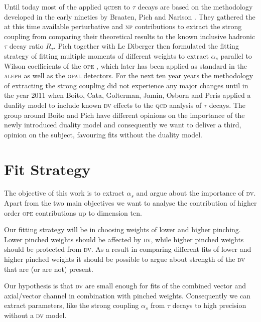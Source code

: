 \documentclass[../../index.tex]{subfiles}
\begin{document}
Until today most of the applied \textsc{qcdsr} to \(\tau\) decays are based on
the methodology developed in the early nineties by Braaten, Pich and Narison
\cite{Braaten1991}. They gathered the at this time available perturbative and
\textsc{np} contributions to extract the strong coupling from comparing their
theoretical results to the known inclusive hadronic \(\tau\) decay ratio
\(R_\tau\). Pich together with Le Diberger then formulated the fitting strategy
of fitting multiple moments of different weights to extract \(\alpha_s\)
parallel to Wilson coefficients of the \textsc{ope} \cite{LeDiberger1992}, which
later has been applied as standard in the \textsc{aleph} \cite{Aleph1993} as
well as the \textsc{opal} \cite{Opal1998} detectors. For the next ten year years
the methodology of extracting the strong coupling did not experience any major
changes until in the year 2011 when Boito, Cata, Golterman, Jamin, Osborn and
Peris \cite{Boito2011a} applied a duality model to include known \textsc{dv}
effects to the \textsc{qcd} analysis of \(\tau\) decays. The group around Boito
and Pich have different opinions on the importance of the newly introduced
duality model \cite{Pich2016,Boito2016,} and consequently we want to deliver a
third, opinion on the subject, favouring fits without the duality model.


\section{Fit Strategy}
The objective of this work is to extract \(\alpha_s\) and argue about the
importance of \textsc{dv}. Apart from the two main objectives we want to analyse
the contribution of higher order \textsc{ope} contributions up to dimension ten.

Our fitting strategy will be in choosing weights of lower and higher pinching.
Lower pinched weights should be affected by \textsc{dv}, while higher pinched
weights should be protected from \textsc{dv}. As a result in comparing different
fits of lower and higher pinched weights it should be possible to argue about
strength of the \textsc{dv} that are (or are not) present.

Our hypothesis is that \textsc{dv} are small enough for fits of the combined
vector and axial\-/vector channel in combination with pinched weights.
Consequently we can extract parameters, like the strong coupling \(\alpha_s\)
from \(\tau\) decays to high precision without a \textsc{dv} model.
\end{document}
